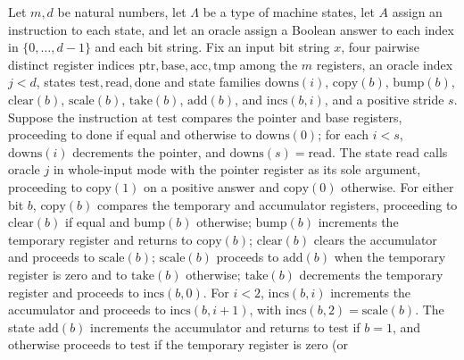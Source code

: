 \begin{theorem}
\label{Complexity.LogProg.boundedDecodeStride_loop}
\leanok
{}
Let $m,d$ be natural numbers, let $\Lambda$ be a type of machine states, let $A$ assign
an instruction to each state, and let an oracle assign a Boolean answer to each index in
$\{0,\ldots,d-1\}$ and each bit string. Fix an input bit string $x$, four pairwise
distinct register indices $\mathrm{ptr},\mathrm{base},\mathrm{acc},\mathrm{tmp}$ among
the $m$ registers, an oracle index $j<d$, states
$\mathrm{test},\mathrm{read},\mathrm{done}$ and state families $\mathrm{downs}(i)$,
$\mathrm{copy}(b)$, $\mathrm{bump}(b)$, $\mathrm{clear}(b)$, $\mathrm{scale}(b)$,
$\mathrm{take}(b)$, $\mathrm{add}(b)$, and $\mathrm{incs}(b,i)$, and a positive stride
$s$. Suppose the instruction at $\mathrm{test}$ compares the pointer and base registers,
proceeding to $\mathrm{done}$ if equal and otherwise to $\mathrm{downs}(0)$; for each
$i<s$, $\mathrm{downs}(i)$ decrements the pointer, and
$\mathrm{downs}(s)=\mathrm{read}$. The state $\mathrm{read}$ calls oracle $j$ in
whole-input mode with the pointer register as its sole argument, proceeding to
$\mathrm{copy}(1)$ on a positive answer and $\mathrm{copy}(0)$ otherwise. For either bit
$b$, $\mathrm{copy}(b)$ compares the temporary and accumulator registers, proceeding to
$\mathrm{clear}(b)$ if equal and $\mathrm{bump}(b)$ otherwise; $\mathrm{bump}(b)$
increments the temporary register and returns to $\mathrm{copy}(b)$; $\mathrm{clear}(b)$
clears the accumulator and proceeds to $\mathrm{scale}(b)$; $\mathrm{scale}(b)$ proceeds
to $\mathrm{add}(b)$ when the temporary register is zero and to $\mathrm{take}(b)$
otherwise; $\mathrm{take}(b)$ decrements the temporary register and proceeds to
$\mathrm{incs}(b,0)$. For $i<2$, $\mathrm{incs}(b,i)$ increments the accumulator and
proceeds to $\mathrm{incs}(b,i+1)$, with $\mathrm{incs}(b,2)=\mathrm{scale}(b)$. The
state $\mathrm{add}(b)$ increments the accumulator and returns to $\mathrm{test}$ if
$b=1$, and otherwise proceeds to $\mathrm{test}$ if the temporary register is zero (or

\end{theorem}
